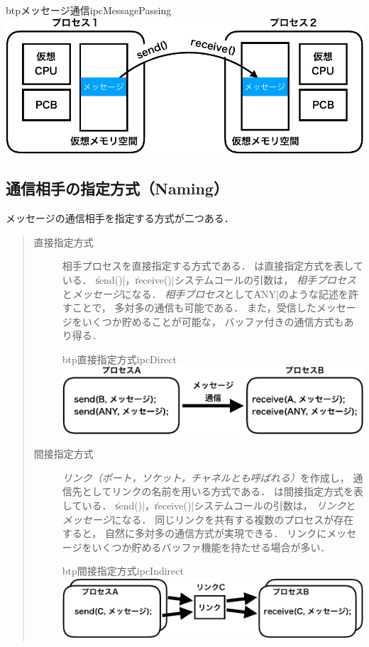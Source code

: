 \begin{myfig}{btp}{メッセージ通信}{ipcMessagePassing}
  \includegraphics[scale=0.6]{Fig/ipcMessagePassing-crop.pdf}
\end{myfig}

\subsection{通信相手の指定方式（Naming）}
メッセージの通信相手を指定する方式が二つある．

\begin{quote}
  \begin{description}
  \item[直接指定方式]
    相手プロセスを直接指定する方式である．
    は直接指定方式を表している．
    \|send()|，\|receive()|システムコールの引数は，
    \emph{相手プロセス}と\emph{メッセージ}になる．
    \emph{相手プロセス}として\|ANY|のような記述を許すことで，
    多対多の通信も可能である．
    また，受信したメッセージをいくつか貯めることが可能な，
    バッファ付きの通信方式もあり得る．
    \begin{myfig}{btp}{直接指定方式}{ipcDirect}
      \includegraphics[scale=0.6]{Fig/ipcDirect-crop.pdf}
    \end{myfig}
  \item[間接指定方式]
    \emph{リンク（ポート，ソケット，チャネルとも呼ばれる）}を作成し，
    通信先としてリンクの名前を用いる方式である．
    は間接指定方式を表している．
    \|send()|，\|receive()|システムコールの引数は，
    \emph{リンク}と\emph{メッセージ}になる．
    同じリンクを共有する複数のプロセスが存在すると，
    自然に多対多の通信方式が実現できる．
    リンクにメッセージをいくつか貯めるバッファ機能を持たせる場合が多い．
    \begin{myfig}{btp}{間接指定方式}{ipcIndirect}
      \includegraphics[scale=0.6]{Fig/ipcIndirect-crop.pdf}
    \end{myfig}
  \end{description}
\end{quote}

